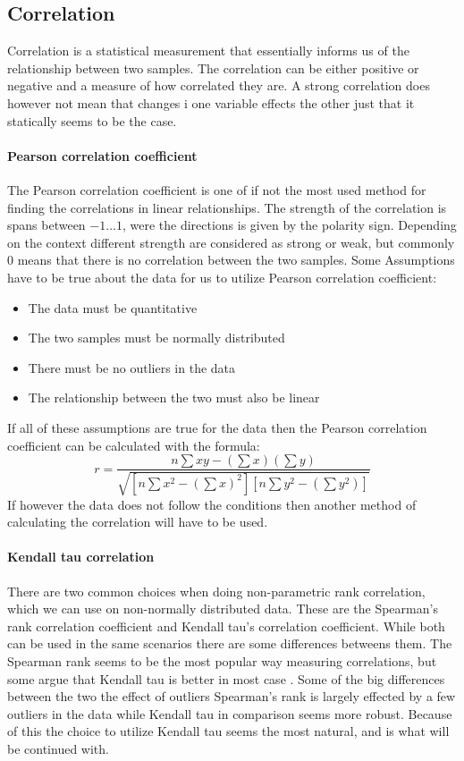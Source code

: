 \subsection{Correlation}
Correlation is a statistical measurement that essentially informs us of the relationship between two samples. The correlation can be either positive or negative and a measure of how correlated they are. A strong correlation does however not mean that changes i one variable effects the other just that it statically seems to be the case.
\paragraph{Pearson correlation coefficient} The Pearson correlation coefficient is one of if not the most used method for finding the correlations in linear relationships. The strength of the correlation is spans between $-1 \dotsc 1$, were the directions is given by the polarity sign. Depending on the context different strength are considered as strong or weak, but commonly 0 means that there is no correlation between the two samples. Some Assumptions have to be true about the data for us to utilize Pearson correlation coefficient:
\begin{itemize}
    \item The data must be quantitative
    \item The two samples must be normally distributed
    \item There must be no outliers in the data
    \item The relationship between the two must also be linear
\end{itemize}
If all of these assumptions are true for the data then the Pearson correlation coefficient can be calculated with the formula:
$$r=\frac{n\sum{xy- (\sum{x})(\sum{y})}}{\sqrt{[n\sum{x^2}-(\sum{x})^2][n\sum{y^2}-(\sum{y}^2)]}}$$
If however the data does not follow the conditions then another method of calculating the correlation will have to be used. 
\paragraph{Kendall tau correlation}
There are two common choices when doing non-parametric rank correlation, which we can use on non-normally distributed data. These are the Spearman's rank correlation coefficient and Kendall tau's correlation coefficient. While both can be used in the same scenarios there are some differences betweens them. The Spearman rank seems to be the most popular way measuring correlations, but some argue that Kendall tau is better in most case \cite{gilpin1993table}. Some of the big differences between the two the effect of outliers Spearman's rank is largely effected by a few outliers in the data while Kendall tau in comparison seems more robust. Because of this the choice to utilize Kendall tau seems the most natural, and is what will be continued with. 